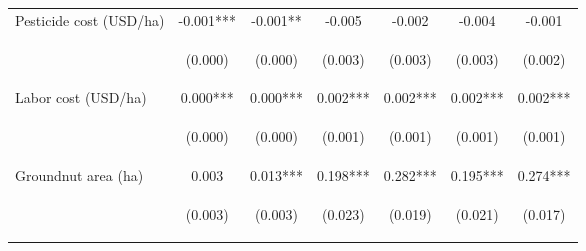 \begin{center}
\begin{tabular}{lcccccc}
Pesticide cost (USD/ha) & -0.001*** & -0.001** & -0.005 & -0.002 & -0.004 & -0.001 \\
\vspace{4pt} & \begin{footnotesize}(0.000)\end{footnotesize} & \begin{footnotesize}(0.000)\end{footnotesize} & \begin{footnotesize}(0.003)\end{footnotesize} & \begin{footnotesize}(0.003)\end{footnotesize} & \begin{footnotesize}(0.003)\end{footnotesize} & \begin{footnotesize}(0.002)\end{footnotesize} \\
Labor cost (USD/ha) & 0.000*** & 0.000*** & 0.002*** & 0.002*** & 0.002*** & 0.002*** \\
\vspace{4pt} & \begin{footnotesize}(0.000)\end{footnotesize} & \begin{footnotesize}(0.000)\end{footnotesize} & \begin{footnotesize}(0.001)\end{footnotesize} & \begin{footnotesize}(0.001)\end{footnotesize} & \begin{footnotesize}(0.001)\end{footnotesize} & \begin{footnotesize}(0.001)\end{footnotesize} \\
Groundnut area (ha) & 0.003 & 0.013*** & 0.198*** & 0.282*** & 0.195*** & 0.274*** \\
\vspace{4pt} & \begin{footnotesize}(0.003)\end{footnotesize} & \begin{footnotesize}(0.003)\end{footnotesize} & \begin{footnotesize}(0.023)\end{footnotesize} & \begin{footnotesize}(0.019)\end{footnotesize} & \begin{footnotesize}(0.021)\end{footnotesize} & \begin{footnotesize}(0.017)\end{footnotesize} \\

\end{tabular}
\end{center}
